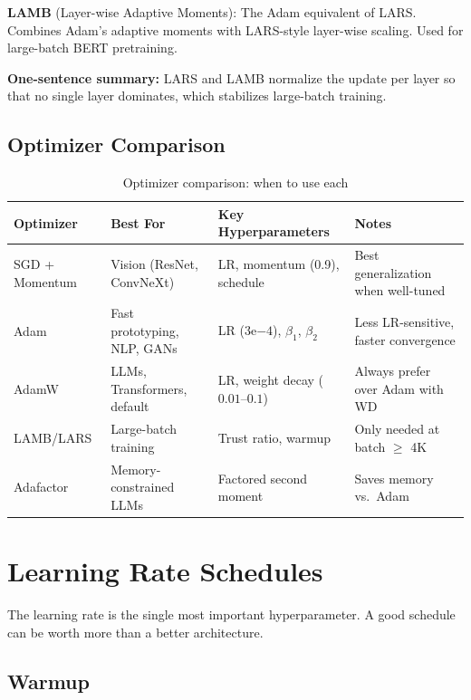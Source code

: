 \textbf{LAMB} (Layer-wise Adaptive Moments): The Adam equivalent of LARS. Combines Adam's adaptive moments with LARS-style layer-wise scaling. Used for large-batch BERT pretraining.

\textbf{One-sentence summary:} LARS and LAMB normalize the update per layer so that no single layer dominates, which stabilizes large-batch training.

\subsection{Optimizer Comparison}

\begin{table}[H]
\centering
\caption{Optimizer comparison: when to use each}
\begin{tabularx}{\textwidth}{lXXX}
\toprule
\textbf{Optimizer} & \textbf{Best For} & \textbf{Key Hyperparameters} & \textbf{Notes} \\
\midrule
SGD + Momentum & Vision (ResNet, ConvNeXt) & LR, momentum (0.9), schedule & Best generalization when well-tuned \\
Adam & Fast prototyping, NLP, GANs & LR ($3\mathrm{e}{-4}$), $\beta_1$, $\beta_2$ & Less LR-sensitive, faster convergence \\
AdamW & LLMs, Transformers, default & LR, weight decay ($0.01$--$0.1$) & Always prefer over Adam with WD \\
LAMB/LARS & Large-batch training & Trust ratio, warmup & Only needed at batch $\geq$ 4K \\
Adafactor & Memory-constrained LLMs & Factored second moment & Saves memory vs.\ Adam \\
\bottomrule
\end{tabularx}
\end{table}

\section{Learning Rate Schedules}
\label{sec:lr_schedules}

The learning rate is the single most important hyperparameter. A good schedule can be worth more than a better architecture.

\subsection{Warmup}

